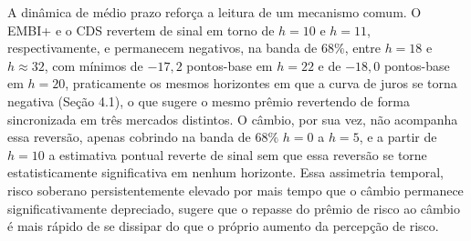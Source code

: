 \documentclass[preprint,authoryear,review,12pt]{elsarticle}
\begin{document}
A dinâmica de médio prazo reforça a leitura de um mecanismo comum. O EMBI+ e o CDS revertem de sinal em torno de $h = 10$ e $h = 11$, respectivamente, e permanecem negativos, na banda de $68\%$, entre $h = 18$ e $h  \approx 32$, com mínimos de $-17,\!2$ pontos-base em $h = 22$ e de $-18,\!0$ pontos-base em $h = 20$,  praticamente os mesmos horizontes em que a curva de juros se torna negativa (Seção 4.1), o que sugere o mesmo prêmio revertendo de forma sincronizada em três mercados distintos. O câmbio, por sua vez, não acompanha essa reversão, apenas cobrindo na banda de $68\%$ $h = 0$ a $h = 5$, e a partir de $h = 10$ a estimativa pontual reverte de sinal sem que essa reversão se torne estatisticamente significativa em nenhum horizonte. Essa assimetria temporal, risco soberano persistentemente elevado por mais tempo que o câmbio permanece significativamente depreciado, sugere que o repasse do prêmio de risco ao câmbio é mais rápido de se dissipar do que o próprio aumento da percepção de risco.




\end{document}
